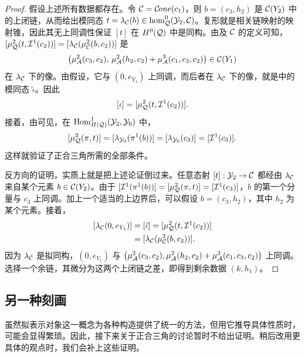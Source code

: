 \begin{proof}
假设上述所有数据都存在。令 $\mathcal C=\mathcal C\!\mathit{one}(c_1)$，则 $b=(c_3,h_2)$ 是 $\mathcal C(Y_2)$ 中的上闭链，从而给出模同态 $t=\lambda_{\mathcal C}(b)\in\hom^0_{\mathcal Q}(\mathcal Y_2,\mathcal C)$。复形就是相关链映射的映射锥，因此其无上同调性保证 $[t]$ 在 $H^0(\mathcal Q)$ 中是同构。由及 $\mathcal C$ 的定义可知，$[\mu^2_{\mathcal Q}(t,\mathcal I^1(c_2))]=[\lambda_{\mathcal C}(\mu^2_{\mathcal C}(b,c_2))]$ 是
\[
\bigl(\mu^2_{\mathcal A}(c_3,c_2),\,\mu^2_{\mathcal A}(h_2,c_2)+\mu^3_{\mathcal A}(c_1,c_3,c_2)\bigr)\in\mathcal C(Y_1)
\]
在 $\lambda_{\mathcal C}$ 下的像。由假设，它与 $(0,e_{Y_1})$ 上同调，而后者在 $\lambda_{\mathcal C}$ 下的像，就是中的模同态 $\tilde\iota$。因此
\[
[\iota]=[\mu^2_{\mathcal Q}(t,\mathcal I^1(c_2))].
\]
接着，由可见，在 $\operatorname{Hom}^1_{H(\mathcal Q)}(\mathcal Y_2,\mathcal Y_0)$ 中，
\[
[\mu^2_{\mathcal Q}(\pi,t)]=[\lambda_{\mathcal Y_0}(\pi^1(b))]=[\lambda_{\mathcal Y_0}(c_3)]=[\mathcal I^1(c_3)].
\]
这样就验证了正合三角所需的全部条件。

反方向的证明，实质上就是把上述论证倒过来。任意态射 $[t]:\mathcal Y_2\to\mathcal C$ 都经由 $\lambda_{\mathcal C}$ 来自某个元素 $b\in\mathcal C(Y_2)$。由于 $[\mathcal I^1(\pi^1(b))]=[\mu^2_{\mathcal Q}(\pi,t)]=[\mathcal I^1(c_3)]$，$b$ 的第一个分量与 $c_3$ 上同调。加上一个适当的上边界后，可以假设 $b=(c_3,h_2)$，其中 $h_2$ 为某个元素。接着，
\[
\begin{aligned}
{}[\lambda_{\mathcal C}(0,e_{Y_1})]&=[\tilde\iota]=[\mu^2_{\mathcal Q}(t,\mathcal I^1(c_2))]\\
&=[\lambda_{\mathcal C}(\mu^2_{\mathcal C}(b,c_2))].
\end{aligned}
\]
因为 $\lambda_{\mathcal C}$ 是拟同构，$(0,e_{Y_1})$ 与 $\bigl(\mu^2_{\mathcal A}(c_3,c_2),\mu^2_{\mathcal A}(h_2,c_2)+\mu^3_{\mathcal A}(c_1,c_3,c_2)\bigr)$ 上同调。选择一个余链，其微分为这两个上闭链之差，即得到剩余数据 $(k,h_1)$。
\end{proof}

\subsection{另一种刻画}\label{sec:3g}
虽然拟表示对象这一概念为各种构造提供了统一的方法，但用它推导具体性质时，可能会显得繁琐。因此，接下来关于正合三角的讨论暂时不给出证明。稍后改用更具体的观点时，我们会补上这些证明。

